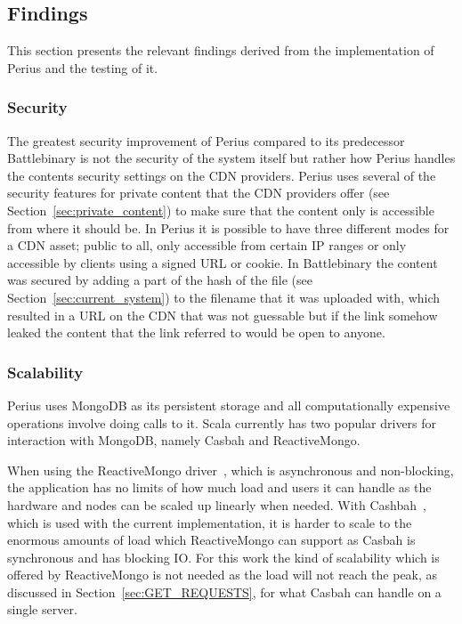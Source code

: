 \documentclass[a4paper,12pt]{article}
\begin{document}
\subsection{Findings}
This section presents the relevant findings derived from the implementation of Perius and the 
testing of it.  

\subsubsection{Security}
The greatest security improvement of Perius compared to its predecessor Battlebinary is not the
security of the system itself but rather how Perius handles the contents security settings on the
CDN providers. Perius uses several of the security features for private content that the CDN
providers offer (see Section~\ref{sec:private_content}) to make sure that the content only is
accessible from where it should be. In Perius it is possible to have three different modes for a CDN
asset; public to all, only accessible from certain IP ranges or only accessible by clients using a
signed URL or cookie. In Battlebinary the content was secured by adding a part of the hash of the
file (see Section~\ref{sec:current_system}) to the filename that it was uploaded with, which
resulted in a URL on the CDN that was not guessable but if the link somehow leaked the content that
the link referred to would be open to anyone.

\subsubsection{Scalability}
Perius uses MongoDB as its persistent storage and all computationally expensive operations involve
doing calls to it. Scala currently has two popular drivers for interaction with MongoDB, namely
Casbah and ReactiveMongo.

When using the ReactiveMongo driver~\cite{REACTIVEMONGO}, which is asynchronous and non-blocking, 
the application has no limits of how much load and users it can handle as the hardware and nodes 
can be scaled up linearly when needed. With Cashbah~\cite{CASBAH}, which is used with the current 
implementation, it is harder to scale to the enormous amounts of load which ReactiveMongo can 
support as Casbah is synchronous and has blocking IO. For this work the kind of scalability which 
is offered by ReactiveMongo is not needed as the load will not reach the peak, as discussed in 
Section~\ref{sec:GET_REQUESTS}, for what Casbah can handle on a single server. 
\end{document}

